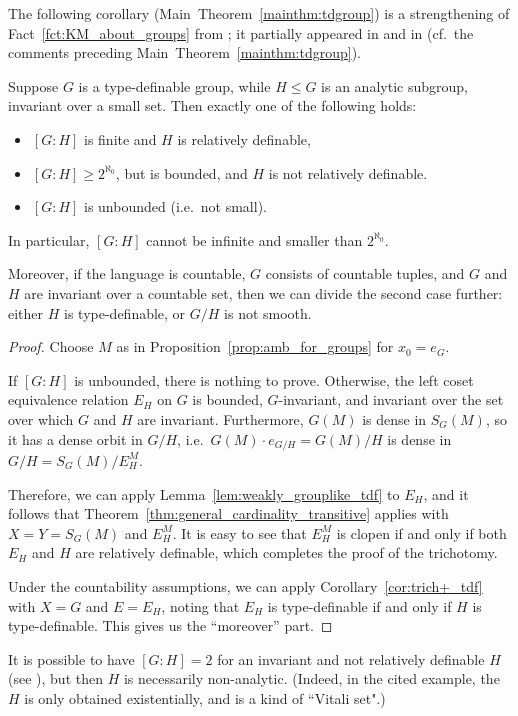 	The following corollary (Main~Theorem~\ref{mainthm:tdgroup}) is a strengthening of Fact~\ref{fct:KM_about_groups} from \cite{KM14}; it partially appeared in \cite{KPR15} and in \cite{KR18} (cf.\ the comments preceding Main~Theorem~\ref{mainthm:tdgroup}).
	\begin{cor}
		\label{cor:trich_tdgroups}
		Suppose $G$ is a type-definable group, while $H\leq G$ is an analytic subgroup, invariant over a small set. Then exactly one of the following holds:
		\begin{itemize}
			\item
			$[G:H]$ is finite and $H$ is relatively definable,
			\item
			$[G:H]\geq 2^{\aleph_0}$, but is bounded, and $H$ is not relatively definable.
			\item
			$[G:H]$ is unbounded (i.e.\ not small).
		\end{itemize}
		In particular, $[G:H]$ cannot be infinite and smaller than $2^{\aleph_0}$.
		
		Moreover, if the language is countable, $G$ consists of countable tuples, and $G$ and $H$ are invariant over a countable set, then we can divide the second case further: either $H$ is type-definable, or $G/H$ is not smooth.
	\end{cor}
	\begin{proof}
		Choose $M$ as in Proposition~\ref{prop:amb_for_groups} for $x_0=e_G$.
		
		If $[G:H]$ is unbounded, there is nothing to prove. Otherwise, the left coset equivalence relation $E_H$ on $G$ is bounded, $G$-invariant, and invariant over the set over which $G$ and $H$ are invariant.
		Furthermore, $G(M)$ is dense in $S_G(M)$, so it has a dense orbit in $G/H$, i.e.\ $G(M)\cdot e_{G/H}=G(M)/H$ is dense in $G/H=S_G(M)/E_H^M$.
		
		Therefore, we can apply Lemma~\ref{lem:weakly_grouplike_tdf} to $E_H$, and it follows that Theorem~\ref{thm:general_cardinality_transitive} applies with $X=Y=S_G(M)$ and $E_H^M$. It is easy to see that $E_H^M$ is clopen if and only if both $E_H$ and $H$ are relatively definable, which completes the proof of the trichotomy.
		
		Under the countability assumptions, we can apply Corollary~\ref{cor:trich+_tdf} with $X=G$ and $E=E_H$, noting that $E_H$ is type-definable if and only if $H$ is type-definable. This gives us the ``moreover'' part.
	\end{proof}
	
	\begin{rem}
		It is possible to have $[G:H]=2$ for an invariant and not relatively definable $H$ (see \cite[Example 3.39]{KM14}), but then $H$ is necessarily non-analytic. (Indeed, in the cited example, the $H$ is only obtained existentially, and is a kind of ``Vitali set".)\xqed{\lozenge}
	\end{rem}
	
